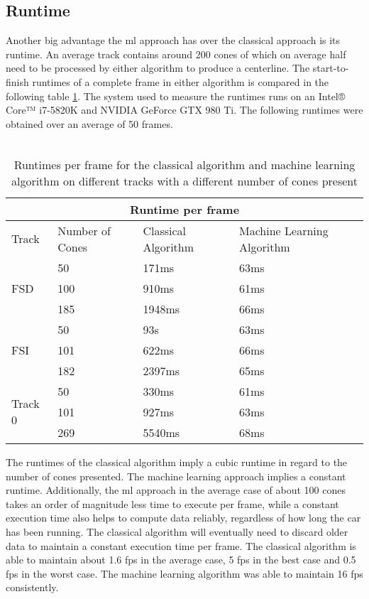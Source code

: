 \subsection{Runtime}
Another big advantage the \ac{ml} approach has over the classical approach is its runtime. An average track contains around 200 cones of which on average half need to be processed by either algorithm to produce a centerline. The start-to-finish runtimes of a complete frame in either algorithm is compared in the following table \ref{table:2}. The system used to measure the runtimes runs on an Intel® Core™ i7-5820K and NVIDIA GeForce GTX 980 Ti. The following runtimes were obtained over an average of 50 frames.\\\\
\begin{table}[h!]
\centering
\begin{tabular}{ |p{1.5cm} p{3cm}||p{4cm}|p{5cm}|  }
    \hline
    \multicolumn{4}{|c|}{Runtime per frame} \\
    \hline
    Track  & Number of Cones  & Classical Algorithm & Machine Learning Algorithm\\
    \hline
    \hline

    \multirow{3}{*}{FSD} & 50  & 171ms & 63ms \\
                         & 100 & 910ms & 61ms\\
                         & 185 & 1948ms & 66ms\\ 
                         \hline
    \multirow{3}{*}{FSI} & 50  & 93s & 63ms\\
                         & 101 & 622ms & 66ms\\
                         & 182 & 2397ms & 65ms\\ 
                         \hline
    \multirow{3}{*}{Track 0} & 50  & 330ms & 61ms\\
                             & 101 & 927ms & 63ms\\
                             & 269 & 5540ms & 68ms\\ 
                             \hline
   \end{tabular}
\caption{Runtimes per frame for the classical algorithm and machine learning algorithm on different tracks with a different number of cones present}
\label{table:2}
\end{table}
$ $\\
The runtimes of the classical algorithm imply a cubic runtime in regard to the number of cones presented. The machine learning approach implies a constant runtime. Additionally, the \ac{ml} approach in the average case of about 100 cones takes an order of magnitude less time to execute per frame, while a constant execution time also helps to compute data reliably, regardless of how long the car has been running. The classical algorithm will eventually need to discard older data to maintain a constant execution time per frame. The classical algorithm is able to maintain about 1.6 \ac{fps} in the average case, 5 \ac{fps} in the best case and 0.5 \ac{fps} in the worst case. The machine learning algorithm was able to maintain 16 \ac{fps} consistently. 